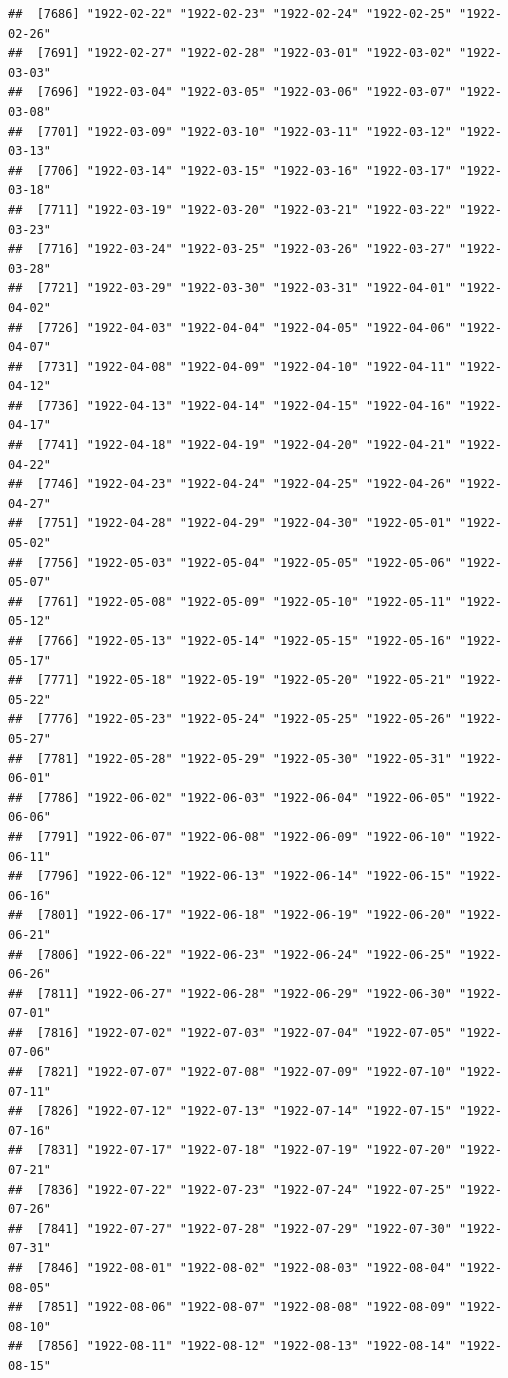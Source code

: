 \documentclass{article}\usepackage[]{graphicx}\usepackage[]{color}
\makeatletter
\newenvironment{kframe}{%
 \def\at@end@of@kframe{}%
 \ifinner\ifhmode%
  \def\at@end@of@kframe{\end{minipage}}%
  \begin{minipage}{\columnwidth}%
 \fi\fi%
 \def\FrameCommand##1{\hskip\@totalleftmargin \hskip-\fboxsep
 \colorbox{shadecolor}{##1}\hskip-\fboxsep
     \hskip-\linewidth \hskip-\@totalleftmargin \hskip\columnwidth}%
 \MakeFramed {\advance\hsize-\width
   \@totalleftmargin\z@ \linewidth\hsize
   \@setminipage}}%
 {\par\unskip\endMakeFramed%
 \at@end@of@kframe}
\newenvironment{knitrout}{}{} %
\makeatother
\begin{document}
\begin{description}
\begin{knitrout}
\begin{kframe}
\begin{verbatim}
##  [7686] "1922-02-22" "1922-02-23" "1922-02-24" "1922-02-25" "1922-02-26"
##  [7691] "1922-02-27" "1922-02-28" "1922-03-01" "1922-03-02" "1922-03-03"
##  [7696] "1922-03-04" "1922-03-05" "1922-03-06" "1922-03-07" "1922-03-08"
##  [7701] "1922-03-09" "1922-03-10" "1922-03-11" "1922-03-12" "1922-03-13"
##  [7706] "1922-03-14" "1922-03-15" "1922-03-16" "1922-03-17" "1922-03-18"
##  [7711] "1922-03-19" "1922-03-20" "1922-03-21" "1922-03-22" "1922-03-23"
##  [7716] "1922-03-24" "1922-03-25" "1922-03-26" "1922-03-27" "1922-03-28"
##  [7721] "1922-03-29" "1922-03-30" "1922-03-31" "1922-04-01" "1922-04-02"
##  [7726] "1922-04-03" "1922-04-04" "1922-04-05" "1922-04-06" "1922-04-07"
##  [7731] "1922-04-08" "1922-04-09" "1922-04-10" "1922-04-11" "1922-04-12"
##  [7736] "1922-04-13" "1922-04-14" "1922-04-15" "1922-04-16" "1922-04-17"
##  [7741] "1922-04-18" "1922-04-19" "1922-04-20" "1922-04-21" "1922-04-22"
##  [7746] "1922-04-23" "1922-04-24" "1922-04-25" "1922-04-26" "1922-04-27"
##  [7751] "1922-04-28" "1922-04-29" "1922-04-30" "1922-05-01" "1922-05-02"
##  [7756] "1922-05-03" "1922-05-04" "1922-05-05" "1922-05-06" "1922-05-07"
##  [7761] "1922-05-08" "1922-05-09" "1922-05-10" "1922-05-11" "1922-05-12"
##  [7766] "1922-05-13" "1922-05-14" "1922-05-15" "1922-05-16" "1922-05-17"
##  [7771] "1922-05-18" "1922-05-19" "1922-05-20" "1922-05-21" "1922-05-22"
##  [7776] "1922-05-23" "1922-05-24" "1922-05-25" "1922-05-26" "1922-05-27"
##  [7781] "1922-05-28" "1922-05-29" "1922-05-30" "1922-05-31" "1922-06-01"
##  [7786] "1922-06-02" "1922-06-03" "1922-06-04" "1922-06-05" "1922-06-06"
##  [7791] "1922-06-07" "1922-06-08" "1922-06-09" "1922-06-10" "1922-06-11"
##  [7796] "1922-06-12" "1922-06-13" "1922-06-14" "1922-06-15" "1922-06-16"
##  [7801] "1922-06-17" "1922-06-18" "1922-06-19" "1922-06-20" "1922-06-21"
##  [7806] "1922-06-22" "1922-06-23" "1922-06-24" "1922-06-25" "1922-06-26"
##  [7811] "1922-06-27" "1922-06-28" "1922-06-29" "1922-06-30" "1922-07-01"
##  [7816] "1922-07-02" "1922-07-03" "1922-07-04" "1922-07-05" "1922-07-06"
##  [7821] "1922-07-07" "1922-07-08" "1922-07-09" "1922-07-10" "1922-07-11"
##  [7826] "1922-07-12" "1922-07-13" "1922-07-14" "1922-07-15" "1922-07-16"
##  [7831] "1922-07-17" "1922-07-18" "1922-07-19" "1922-07-20" "1922-07-21"
##  [7836] "1922-07-22" "1922-07-23" "1922-07-24" "1922-07-25" "1922-07-26"
##  [7841] "1922-07-27" "1922-07-28" "1922-07-29" "1922-07-30" "1922-07-31"
##  [7846] "1922-08-01" "1922-08-02" "1922-08-03" "1922-08-04" "1922-08-05"
##  [7851] "1922-08-06" "1922-08-07" "1922-08-08" "1922-08-09" "1922-08-10"
##  [7856] "1922-08-11" "1922-08-12" "1922-08-13" "1922-08-14" "1922-08-15"

\end{verbatim}
\end{kframe}
\end{knitrout}
\end{description}
\end{document}

